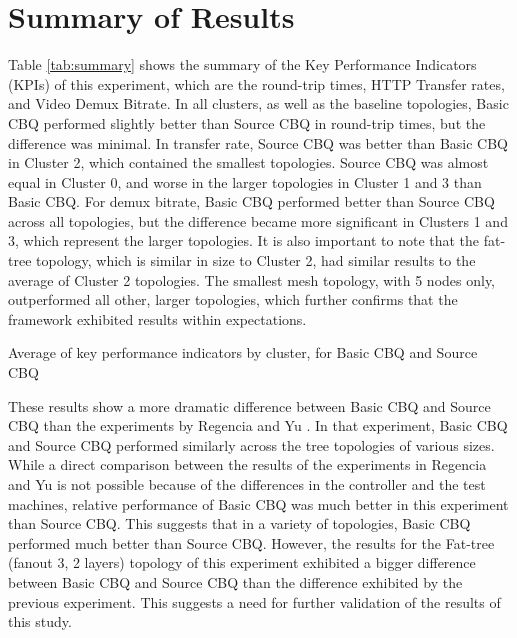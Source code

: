 \section{Summary of Results}

Table \ref{tab:summary} shows the summary of the Key Performance Indicators (KPIs) of this experiment, which are the round-trip times, HTTP Transfer rates, and Video Demux Bitrate. In all clusters, as well as the baseline topologies, Basic CBQ performed slightly better than Source CBQ in round-trip times, but the difference was minimal. In transfer rate, Source CBQ was better than Basic CBQ in Cluster 2, which contained the smallest topologies. Source CBQ was almost equal in Cluster 0, and worse in the larger topologies in Cluster 1 and 3 than Basic CBQ. For demux bitrate, Basic CBQ performed better than Source CBQ across all topologies, but the difference became more significant in Clusters 1 and 3, which represent the larger topologies. It is also important to note that the fat-tree topology, which is similar in size to Cluster 2, had similar results to the average of Cluster 2 topologies. The smallest mesh topology, with 5 nodes only, outperformed all other, larger topologies, which further confirms that the framework exhibited results within expectations.

\begin{table}[htbp]
    \caption{Average of key performance indicators by cluster, for Basic CBQ and Source CBQ}
    \centering
    
    \label{tab:summary}
\end{table}

These results show a more dramatic difference between Basic CBQ and Source CBQ than the experiments by Regencia and Yu \cite{yang_introducing_2022}. In that experiment, Basic CBQ and Source CBQ performed similarly across the tree topologies of various sizes. While a direct comparison between the results of the experiments in Regencia and Yu is not possible because of the differences in the controller and the test machines, relative performance of Basic CBQ was much better in this experiment than Source CBQ. This suggests that in a variety of topologies, Basic CBQ performed much better than Source CBQ. However, the results for the Fat-tree (fanout 3, 2 layers) topology of this experiment exhibited a bigger difference between Basic CBQ and Source CBQ than the difference exhibited by the previous experiment. This suggests a need for further validation of the results of this study.

